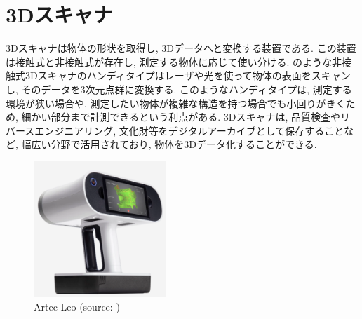 \section{3Dスキャナ}
3Dスキャナは物体の形状を取得し, 3Dデータへと変換する装置である.
この装置は接触式と非接触式が存在し, 測定する物体に応じて使い分ける.
のような非接触式3Dスキャナのハンディタイプはレーザや光を使って物体の表面をスキャンし, そのデータを3次元点群に変換する.
このようなハンディタイプは, 測定する環境が狭い場合や, 測定したい物体が複雑な構造を持つ場合でも小回りがきくため, 細かい部分まで計測できるという利点がある.
3Dスキャナは, 品質検査やリバースエンジニアリング, 文化財等をデジタルアーカイブとして保存することなど, 幅広い分野で活用されており, 物体を3Dデータ化することができる.

\vspace{5mm}
\begin{figure}[H]
     \centering
     \includegraphics[width=50mm]{images/png/artecleo.png}
     \caption[Artec Leo]{Artec Leo (source: \cite{artecleo})}
     \label{Fig:artecleo}
   \end{figure}